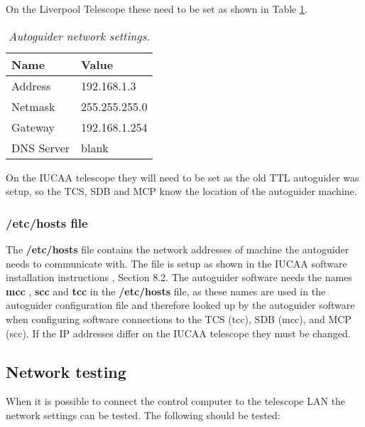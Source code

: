 \documentclass[10pt,a4paper]{article}
\begin{document}
On the Liverpool Telescope these need to be set as shown in Table \ref{tab:autogudiernetworksettings}.

\begin{table}[!h]
\begin{center}
\begin{tabular}{|l|p{20em}|}
\hline
{\bf Name} & {\bf Value}   \\ \hline
Address    & 192.168.1.3   \\ \hline
Netmask    & 255.255.255.0 \\ \hline
Gateway    & 192.168.1.254 \\ \hline
DNS Server & blank         \\ \hline
\end{tabular}
\end{center}
\caption{\em Autoguider network settings.}
\label{tab:autogudiernetworksettings}
\end{table}

On the IUCAA telescope they will need to be set as the old TTL autoguider was setup, so the TCS, SDB and MCP know
the location of the autoguider machine.

\subsubsection{/etc/hosts file}

The {\bf /etc/hosts} file contains the network addresses of machine the autoguider needs to communicate with. The file is setup as shown in the IUCAA software installation instructions \cite{bib:iucaasoftwareinstallation}, Section 8.2. The autoguider software needs the names {\bf mcc} , {\bf scc} and {\bf tcc} in the {\bf /etc/hosts} file, as these names are used in the autoguider configuration file and therefore looked up by the autoguider software when configuring software connections to the TCS (tcc), SDB (mcc), and MCP (scc). If the IP addresses differ on the IUCAA telescope they must be changed.

\subsection{Network testing}
\label{sec:networktesting}

When it is possible to connect the control computer to the telescope LAN the network settings can be tested. The following should be tested:
\end{document}
